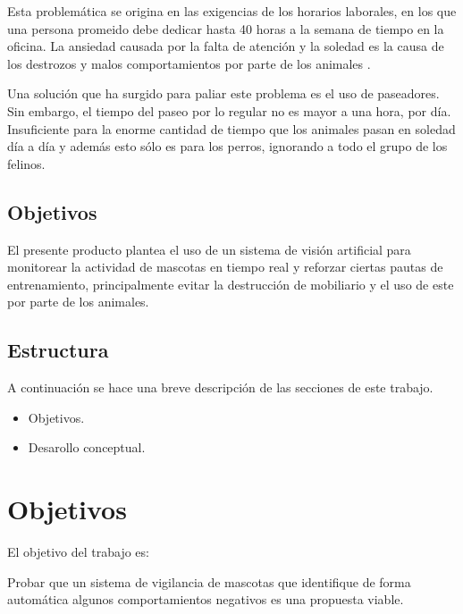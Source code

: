 \documentclass[12pt,a4paper]{proyectoinnovacion}
\begin{document}
Esta problemática se origina en las exigencias de los horarios laborales, en los que una persona promeido debe dedicar hasta 40 horas a la
semana de tiempo en la oficina. La ansiedad causada por la falta de atención y la soledad es la causa de los destrozos y malos comportamientos por parte de los animales \parencite{ibanes2022}.

Una solución que ha surgido para paliar este problema es el uso de paseadores. Sin embargo, el tiempo del paseo por lo regular no es mayor a una hora, por día. Insuficiente para la enorme cantidad de tiempo que los animales pasan en soledad día a día y además esto sólo es para los perros, ignorando a todo el grupo de los felinos.


\subsection{Objetivos}

El presente producto plantea el uso de un sistema de visión artificial para monitorear la actividad de mascotas en tiempo real y reforzar ciertas pautas de entrenamiento, principalmente evitar la destrucción de mobiliario y el uso de este por parte de los animales. 

\subsection{Estructura}

A continuación se hace una breve descripción de las secciones de este trabajo.

\begin{itemize}
  \item Objetivos.
  \item Desarollo conceptual.
\end{itemize}



\section{Objetivos}

El objetivo del trabajo es:

\begin{quotebox}
  Probar que un sistema de vigilancia de mascotas que identifique de forma automática algunos comportamientos negativos es una propuesta viable.
\end{quotebox}
\end{document}
